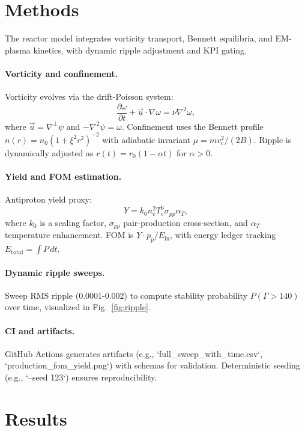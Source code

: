 \documentclass[11pt]{article}
\begin{document}
\section{Methods}
The reactor model integrates vorticity transport, Bennett equilibria, and EM-plasma kinetics, with dynamic ripple adjustment and KPI gating.

\paragraph{Vorticity and confinement.} Vorticity evolves via the drift-Poisson system:
\begin{equation}
\frac{\partial \omega}{\partial t} + \vec{u} \cdot \nabla \omega = \nu \nabla^2 \omega,
\end{equation}
where $\vec{u} = \nabla^\perp \psi$ and $-\nabla^2 \psi = \omega$. Confinement uses the Bennett profile $n(r)=n_0 (1 + \xi^2 r^2)^{-2}$ with adiabatic invariant $\mu = m v_c^2 / (2B)$. Ripple is dynamically adjusted as $r(t) = r_0 (1 - \alpha t)$ for $\alpha > 0$.

\paragraph{Yield and FOM estimation.} Antiproton yield proxy:
\begin{equation}
Y = k_0 n_e^2 T_e^6 \sigma_{pp} \alpha_T,
\end{equation}
where $k_0$ is a scaling factor, $\sigma_{pp}$ pair-production cross-section, and $\alpha_T$ temperature enhancement. FOM is $Y \cdot p_{\bar{p}} / E_{\text{in}}$, with energy ledger tracking $E_{\text{total}} = \int P \, dt$.

\paragraph{Dynamic ripple sweeps.} Sweep RMS ripple (0.0001-0.002) to compute stability probability $P(\Gamma > 140)$ over time, visualized in Fig.~\ref{fig:ripple}.

\paragraph{CI and artifacts.} GitHub Actions generates artifacts (e.g., `full\_sweep\_with\_time.csv`, `production\_fom\_yield.png`) with schemas for validation. Deterministic seeding (e.g., `--seed 123`) ensures reproducibility.

\section{Results}
\end{document}
